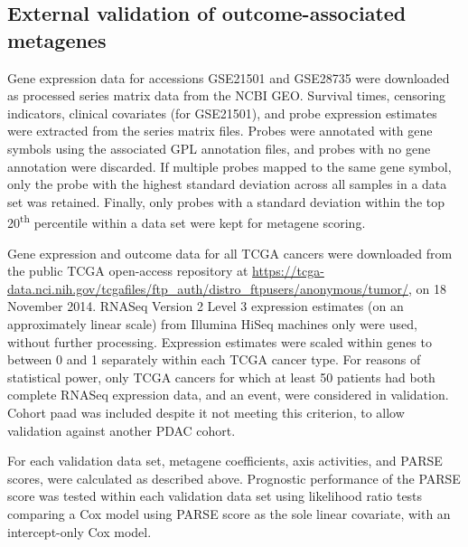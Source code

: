 \documentclass[dissertation.tex]{subfiles}
\begin{document}
\subsection{External validation of outcome-associated metagenes}
Gene expression data for accessions GSE21501 and GSE28735 were downloaded as processed series matrix data from the \gls{NCBI} \gls{GEO}.  Survival times, censoring indicators, clinical covariates (for GSE21501), and probe expression estimates were extracted from the series matrix files.  Probes were annotated with gene symbols using the associated GPL annotation files, and probes with no gene annotation were discarded.  If multiple probes mapped to the same gene symbol, only the probe with the highest standard deviation across all samples in a data set was retained.  Finally, only probes with a standard deviation within the top 20\textsuperscript{th} percentile within a data set were kept for metagene scoring.

Gene expression and outcome data for all \gls{TCGA} cancers were downloaded from the public \gls{TCGA} open-access repository at \url{https://tcga-data.nci.nih.gov/tcgafiles/ftp_auth/distro_ftpusers/anonymous/tumor/}, on 18 November 2014.    RNASeq Version 2 Level 3 expression estimates (on an approximately linear scale) from Illumina HiSeq machines only were used, without further processing.  Expression estimates were scaled within genes to between 0 and 1 separately within each \gls{TCGA} cancer type.  For reasons of statistical power, only \gls{TCGA} cancers for which at least 50 patients had both complete RNASeq expression data, and an event, were considered in validation.  Cohort paad was included despite it not meeting this criterion, to allow validation against another \gls{PDAC} cohort.

For each validation data set, metagene coefficients, axis activities, and \gls{PARSE} scores, were calculated as described above.  Prognostic performance of the \gls{PARSE} score was tested within each validation data set using likelihood ratio tests comparing a Cox model using \gls{PARSE} score as the sole linear covariate, with an intercept-only Cox model.
\end{document}
